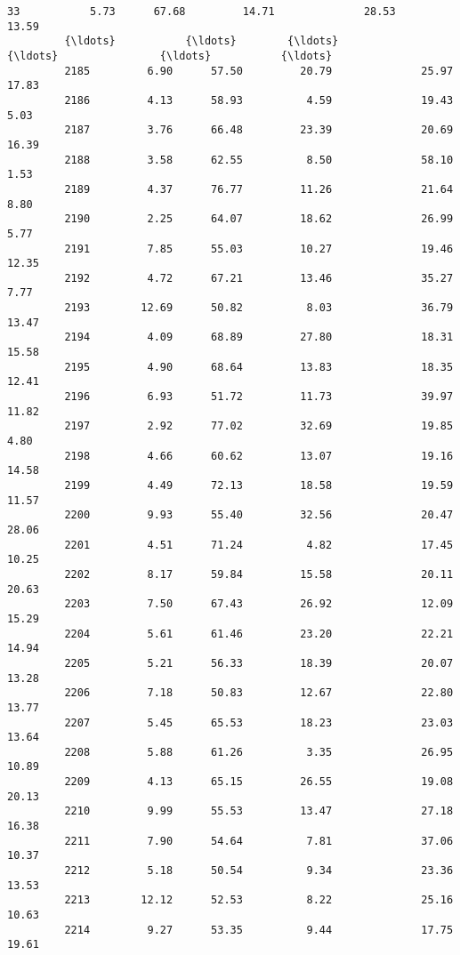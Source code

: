 \documentclass[11pt]{llncs}
\begin{document}
\begin{Verbatim}[commandchars=\\\{\}]
         33           5.73      67.68         14.71              28.53         13.59   
         {\ldots}           {\ldots}        {\ldots}           {\ldots}                {\ldots}           {\ldots}   
         2185         6.90      57.50         20.79              25.97         17.83   
         2186         4.13      58.93          4.59              19.43          5.03   
         2187         3.76      66.48         23.39              20.69         16.39   
         2188         3.58      62.55          8.50              58.10          1.53   
         2189         4.37      76.77         11.26              21.64          8.80   
         2190         2.25      64.07         18.62              26.99          5.77   
         2191         7.85      55.03         10.27              19.46         12.35   
         2192         4.72      67.21         13.46              35.27          7.77   
         2193        12.69      50.82          8.03              36.79         13.47   
         2194         4.09      68.89         27.80              18.31         15.58   
         2195         4.90      68.64         13.83              18.35         12.41   
         2196         6.93      51.72         11.73              39.97         11.82   
         2197         2.92      77.02         32.69              19.85          4.80   
         2198         4.66      60.62         13.07              19.16         14.58   
         2199         4.49      72.13         18.58              19.59         11.57   
         2200         9.93      55.40         32.56              20.47         28.06   
         2201         4.51      71.24          4.82              17.45         10.25   
         2202         8.17      59.84         15.58              20.11         20.63   
         2203         7.50      67.43         26.92              12.09         15.29   
         2204         5.61      61.46         23.20              22.21         14.94   
         2205         5.21      56.33         18.39              20.07         13.28   
         2206         7.18      50.83         12.67              22.80         13.77   
         2207         5.45      65.53         18.23              23.03         13.64   
         2208         5.88      61.26          3.35              26.95         10.89   
         2209         4.13      65.15         26.55              19.08         20.13   
         2210         9.99      55.53         13.47              27.18         16.38   
         2211         7.90      54.64          7.81              37.06         10.37   
         2212         5.18      50.54          9.34              23.36         13.53   
         2213        12.12      52.53          8.22              25.16         10.63   
         2214         9.27      53.35          9.44              17.75         19.61   
         

\end{Verbatim}
\end{document}

